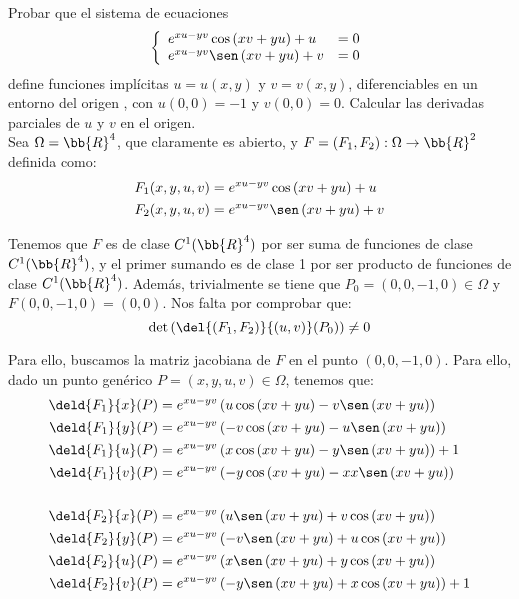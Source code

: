 \begin{ejercicio}
    Probar que el sistema de ecuaciones
    \begin{equation*}
        \left\{
            \begin{array}{ll}
                e^{xu-yv} \cos \left(xv+yu\right) +u&= 0 \\
                e^{xu-yv} \sen \left(xv+yu\right) +v&= 0 \\
            \end{array}
        \right.
    \end{equation*}
    define funciones implícitas $u = u(x, y)$ y $v = v(x, y)$, diferenciables en un entorno
    del origen , con $u(0, 0)=-1$ y $v(0, 0) = 0$. Calcular las derivadas parciales
    de $u$ y $v$ en el origen.\\

    Sea $\Omega = \bb{R}^4$, que claramente es abierto, y $F=(F_1,F_2):\Omega \to \bb{R}^2$ definida como:
    \begin{align*}
        F_1(x,y,u,v) &= e^{xu-yv} \cos \left(xv+yu\right)+u \\
        F_2(x,y,u,v) &= e^{xu-yv} \sen \left(xv+yu\right)+v
    \end{align*}

    Tenemos que $F$ es de clase $C^1(\bb{R}^4)$ por ser suma de funciones de clase $C^1(\bb{R}^4)$, y el primer sumando es de clase 1 por ser producto de funciones de clase $C^1(\bb{R}^4)$. Además, trivialmente se tiene que $P_0=(0,0,-1,0)\in \Omega$ y $F(0,0,-1,0)=(0,0)$. Nos falta por comprobar que:
    \begin{equation*}
        \det \left( \del{(F_1,F_2)}{(u,v)}(P_0) \right) \neq 0
    \end{equation*}

    Para ello, buscamos la matriz jacobiana de $F$ en el punto $(0,0,-1,0)$. Para ello, dado un punto genérico $P=(x,y,u,v)\in \Omega$, tenemos que:
    \begin{align*}
        \deld{F_1}{x}(P) &= e^{xu-yv} \left(u\cos \left(xv+yu\right) -v\sen \left(xv+yu\right)\right) \\
        \deld{F_1}{y}(P) &= e^{xu-yv} \left(-v\cos \left(xv+yu\right) -u\sen \left(xv+yu\right)\right) \\
        \deld{F_1}{u}(P) &= e^{xu-yv} \left(x\cos \left(xv+yu\right) -y\sen \left(xv+yu\right)\right) +1 \\
        \deld{F_1}{v}(P) &= e^{xu-yv} \left(-y\cos \left(xv+yu\right) -xx\sen \left(xv+yu\right)\right) \\ \\
        \deld{F_2}{x}(P) &= e^{xu-yv} \left(u\sen \left(xv+yu\right) +v\cos \left(xv+yu\right)\right) \\
        \deld{F_2}{y}(P) &= e^{xu-yv} \left(-v\sen \left(xv+yu\right) +u\cos \left(xv+yu\right)\right) \\
        \deld{F_2}{u}(P) &= e^{xu-yv} \left(x\sen \left(xv+yu\right) +y\cos \left(xv+yu\right)\right) \\
        \deld{F_2}{v}(P) &= e^{xu-yv} \left(-y\sen \left(xv+yu\right) +x\cos \left(xv+yu\right)\right) +1
    \end{align*}


\end{ejercicio}
